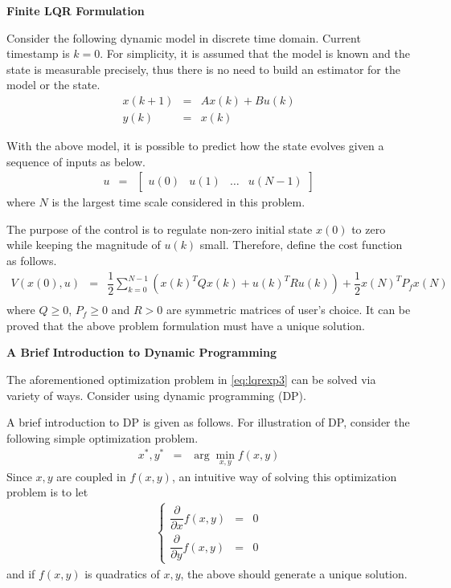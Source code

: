 \vspace{0.1in}
\noindent \textbf{Finite LQR Formulation}
\vspace{0.1in}

Consider the following dynamic model in discrete time domain. Current timestamp is $k=0$. For simplicity, it is assumed that the model is known and the state is measurable precisely, thus there is no need to build an estimator for the model or the state.
\begin{eqnarray}
  x(k+1) &=& Ax(k) + Bu(k) \label{eq:lqrexp1} \\
  y(k) &=& x(k) \label{eq:lqrexp2}
\end{eqnarray}

With the above model, it is possible to predict how the state evolves given a sequence of inputs as below.
\begin{eqnarray}
  u &=& \left[\begin{array}{cccc}
                u(0) & u(1) & \ldots & u(N-1) \nonumber
              \end{array}\right]
\end{eqnarray}
where $N$ is the largest time scale considered in this problem.

The purpose of the control is to regulate non-zero initial state $x(0)$ to zero while keeping the magnitude of $u(k)$ small. Therefore, define the cost function as follows.
\begin{eqnarray}
  V\left(x(0), u\right) &=& \dfrac{1}{2}\sum_{k=0}^{N-1}\left(x(k)^TQx(k) + u(k)^TRu(k)\right) + \dfrac{1}{2}x(N)^TP_fx(N) \nonumber \\ \label{eq:lqrexp3}
\end{eqnarray}
where $Q\geq 0$, $P_f \geq0$ and $R>0$ are symmetric matrices of user's choice. It can be proved that the above problem formulation must have a unique solution.

\vspace{0.1in}
\noindent \textbf{A Brief Introduction to Dynamic Programming}
\vspace{0.1in}

The aforementioned optimization problem in \eqref{eq:lqrexp3} can be solved via variety of ways. Consider using dynamic programming (DP).

A brief introduction to DP is given as follows. For illustration of DP, consider the following simple optimization problem.
\begin{eqnarray}
  x^*, y^* &=& \arg\min_{x,y} f(x, y) \label{eq:dpdemo1}
\end{eqnarray}
Since $x,y$ are coupled in $f(x,y)$, an intuitive way of solving this optimization problem is to let
\begin{eqnarray}
\left\{\begin{array}{ccc}
         \dfrac{\partial}{\partial x}f(x,y) & = & 0 \\
         \dfrac{\partial}{\partial y}f(x,y) & = & 0
       \end{array}\right. \nonumber
\end{eqnarray}
and if $f(x,y)$ is quadratics of $x, y$, the above should generate a unique solution.


